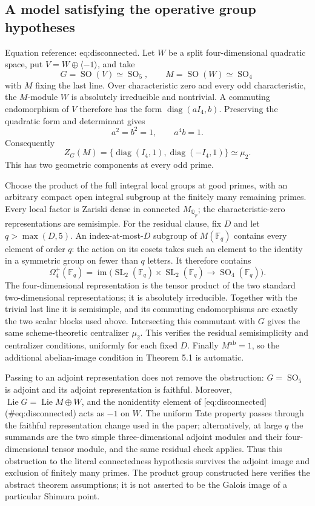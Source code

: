 \documentclass[10pt]{article}
\begin{document}
\subsection*{A model satisfying the operative group hypotheses}
Equation reference: eq:disconnected. Let \(W\) be a split four-dimensional quadratic space, put \(V=W\oplus\langle-1\rangle\), and take \[G=\operatorname{SO}(V)\simeq\operatorname{SO}_5,\qquad M=\operatorname{SO}(W)\simeq\operatorname{SO}_4\] with \(M\) fixing the last line. Over characteristic zero and every odd characteristic, the \(M\)-module \(W\) is absolutely irreducible and nontrivial. A commuting endomorphism of \(V\) therefore has the form \(\operatorname{diag}(aI_4,b)\). Preserving the quadratic form and determinant gives \[a^2=b^2=1,\qquad a^4b=1.\] Consequently \[
 Z_G(M)=\{\operatorname{diag}(I_4,1),\operatorname{diag}(-I_4,1)\}\simeq\mu_2.\] This has two geometric components at every odd prime.\par
Choose the product of the full integral local groups at good primes, with an arbitrary compact open integral subgroup at the finitely many remaining primes. Every local factor is Zariski dense in connected \(M_{\mathbb Q_p}\); the characteristic-zero representations are semisimple. For the residual clause, fix \(D\) and let \(q>\max(D,5)\). An index-at-most-\(D\) subgroup of \(M(\mathbb F_q)\) contains every element of order \(q\): the action on its cosets takes such an element to the identity in a symmetric group on fewer than \(q\) letters. It therefore contains \[\Omega_4^+(\mathbb F_q)
   =\operatorname{im}\bigl(\operatorname{SL}_2(\mathbb F_q)\times\operatorname{SL}_2(\mathbb F_q)
                          \longrightarrow \operatorname{SO}_4(\mathbb F_q)\bigr).\] The four-dimensional representation is the tensor product of the two standard two-dimensional representations; it is absolutely irreducible. Together with the trivial last line it is semisimple, and its commuting endomorphisms are exactly the two scalar blocks used above. Intersecting this commutant with \(G\) gives the same scheme-theoretic centralizer \(\mu_2\). This verifies the residual semisimplicity and centralizer conditions, uniformly for each fixed \(D\). Finally \(M^{\mathrm{ab}}=1\), so the additional abelian-image condition in Theorem 5.1 is automatic.\par
Passing to an adjoint representation does not remove the obstruction: \(G=\operatorname{SO}_5\) is adjoint and its adjoint representation is faithful. Moreover, \(\operatorname{Lie}G=\operatorname{Lie}M\oplus W\), and the nonidentity element of [eq:disconnected] (\#eq:disconnected) acts as \(-1\) on \(W\). The uniform Tate property passes through the faithful representation change used in the paper; alternatively, at large \(q\) the summands are the two simple three-dimensional adjoint modules and their four-dimensional tensor module, and the same residual check applies. Thus this obstruction to the literal connectedness hypothesis survives the adjoint image and exclusion of finitely many primes. The product group constructed here verifies the abstract theorem assumptions; it is not asserted to be the Galois image of a particular Shimura point.\par
\end{document}
